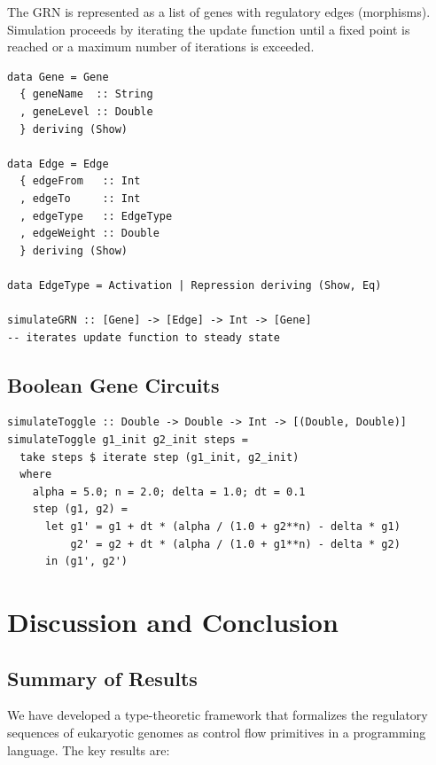 \documentclass[12pt,a4paper]{article}
\begin{document}
The GRN is represented as a list of genes with regulatory edges (morphisms).  Simulation proceeds by iterating the update function until a fixed point is reached or a maximum number of iterations is exceeded.

\begin{lstlisting}[caption={GRN simulation}]
data Gene = Gene
  { geneName  :: String
  , geneLevel :: Double
  } deriving (Show)

data Edge = Edge
  { edgeFrom   :: Int
  , edgeTo     :: Int
  , edgeType   :: EdgeType
  , edgeWeight :: Double
  } deriving (Show)

data EdgeType = Activation | Repression deriving (Show, Eq)

simulateGRN :: [Gene] -> [Edge] -> Int -> [Gene]
-- iterates update function to steady state
\end{lstlisting}

\subsection{Boolean Gene Circuits}

\begin{lstlisting}[caption={Toggle switch simulation}]
simulateToggle :: Double -> Double -> Int -> [(Double, Double)]
simulateToggle g1_init g2_init steps =
  take steps $ iterate step (g1_init, g2_init)
  where
    alpha = 5.0; n = 2.0; delta = 1.0; dt = 0.1
    step (g1, g2) =
      let g1' = g1 + dt * (alpha / (1.0 + g2**n) - delta * g1)
          g2' = g2 + dt * (alpha / (1.0 + g1**n) - delta * g2)
      in (g1', g2')
\end{lstlisting}


\section{Discussion and Conclusion}\label{sec:discussion}

\subsection{Summary of Results}

We have developed a type-theoretic framework that formalizes the regulatory sequences of eukaryotic genomes as control flow primitives in a programming language.  The key results are:
\end{document}
